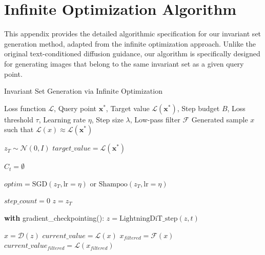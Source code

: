 \documentclass[licencjacka,en]{pracamgr}
\begin{document}
\section{Infinite Optimization Algorithm}\label{appendix:infinite_optimization}
This appendix provides the detailed algorithmic specification for our invariant set generation method, adapted from the infinite optimization approach. Unlike the original text-conditioned diffusion guidance, our algorithm is specifically designed for generating images that belong to the same invariant set as a given query point.
\begin{algorithm}[H]
\caption{Invariant Set Generation via Infinite Optimization}
\label{alg:invariant_generation}
\begin{algorithmic}[1]
\Require Loss function $\mathcal{L}$, Query point $\mathbf{x^*}$, Target value $\mathcal{L}(\mathbf{x^*})$, Step budget $B$, Loss threshold $\tau$, Learning rate $\eta$, Step size $\lambda$, Low-pass filter $\mathcal{F}$
\Ensure Generated sample $x$ such that $\mathcal{L}(x) \approx \mathcal{L}(\mathbf{x^*})$

\State $z_T \sim \mathcal{N}(0, I)$ 
\State $target\_value = \mathcal{L}(\mathbf{x^*})$ 

 
    \State $C_t = \emptyset$ 
\EndFor

\State $optim = \text{SGD}(z_T, \text{lr}=\eta) \text{ or } \text{Shampoo}(z_T, \text{lr}=\eta)$ 

\State $step\_count = 0$ 
 
    \State $z = z_T$ 
    
     
        \State \textbf{with} gradient\_checkpointing():
        \State \quad $z = \text{LightningDiT\_step}(z, t)$ 
    \EndFor
    
    \State $x = \mathcal{D}(z)$ 
    \State $current\_value = \mathcal{L}(x)$ 
    \State $x_{filtered} = \mathcal{F}(x)$ 
    \State $current\_value_{filtered} = \mathcal{L}(x_{filtered})$ 
    

\end{algorithmic}
\end{algorithm}
\end{document}
